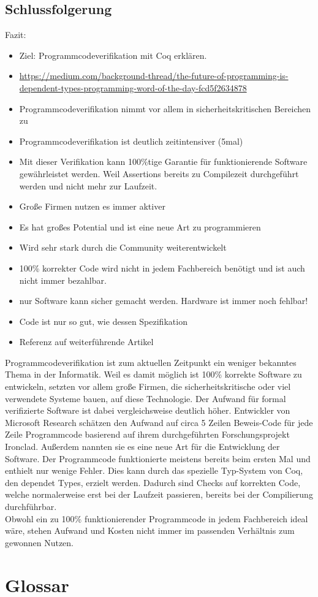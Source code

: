 \subsection{Schlussfolgerung}
Fazit:
\begin{itemize}
	\item Ziel: Programmcodeverifikation mit Coq erklären.
	
	\item \url{https://medium.com/background-thread/the-future-of-programming-is-dependent-types-programming-word-of-the-day-fcd5f2634878}
	\item Programmcodeverifikation nimmt vor allem in sicherheitskritischen Bereichen zu
	\item Programmcodeverifikation ist deutlich zeitintensiver (5mal)
	\item Mit dieser Verifikation kann 100\%tige Garantie für funktionierende Software gewährleistet werden. Weil Assertions bereits zu Compilezeit durchgeführt werden und nicht mehr zur Laufzeit.
	\item Große Firmen nutzen es immer aktiver
	\item Es hat großes Potential und ist eine neue Art zu programmieren
	\item Wird sehr stark durch die Community weiterentwickelt

	\item 100\% korrekter Code wird nicht in jedem Fachbereich benötigt und ist auch nicht immer bezahlbar.
	\item nur Software kann sicher gemacht werden. Hardware ist immer noch fehlbar!
	\item Code ist nur so gut, wie dessen Spezifikation
	\item Referenz auf weiterführende Artikel 
\end{itemize}

Programmcodeverifikation ist zum aktuellen Zeitpunkt ein weniger bekanntes Thema in der Informatik. Weil es damit möglich ist 100\% korrekte Software zu entwickeln, setzten vor allem große Firmen, die sicherheitskritische oder viel verwendete Systeme bauen, auf diese Technologie. Der Aufwand für formal verifizierte Software ist dabei vergleichsweise deutlich höher. Entwickler von Microsoft Research schätzen den Aufwand auf circa 5 Zeilen Beweis-Code für jede Zeile Programmcode basierend auf ihrem durchgeführten Forschungsprojekt Ironclad. Außerdem nannten sie es eine neue Art für die Entwicklung der Software. Der Programmcode funktionierte meistens bereits beim ersten Mal und enthielt nur wenige Fehler. Dies kann durch das spezielle Typ-System von Coq, den dependet Types, erzielt werden. Dadurch sind Checks auf korrekten Code, welche normalerweise erst bei der Laufzeit passieren, bereits bei der Compilierung durchführbar.\\
Obwohl ein zu 100\% funktionierender Programmcode in jedem Fachbereich ideal wäre, stehen Aufwand und Kosten nicht immer im passenden Verhältnis zum gewonnen Nutzen.


\section{Glossar}


